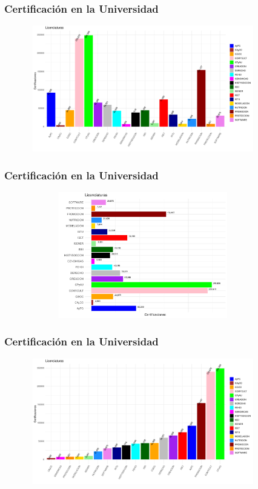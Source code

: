 \documentclass[xcolor=dvipsnames]{beamer}
\begin{document}
\begin{frame}\frametitle{Certificaci\'on en la Universidad}
\textbf{
}
\begin{figure}[H]
\centering
\includegraphics[width=10cm,height=5.5cm]{Imagenes/graficoCertificacionesLic.pdf}
\end{figure}
\end{frame}




\begin{frame}\frametitle{Certificaci\'on en la Universidad}
\textbf{
}
\begin{figure}[H]
\centering
\includegraphics[width=10cm,height=5.5cm]{Imagenes/graficoCertificacionesLicenciaturas.pdf}
\end{figure}
\end{frame}




\begin{frame}\frametitle{Certificaci\'on en la Universidad}
\textbf{
}
\begin{figure}[H]
\centering
\includegraphics[width=10cm,height=5.5cm]{Imagenes/graficoCertificacionesLicGral.pdf}
\end{figure}
\end{frame}
\end{document}
